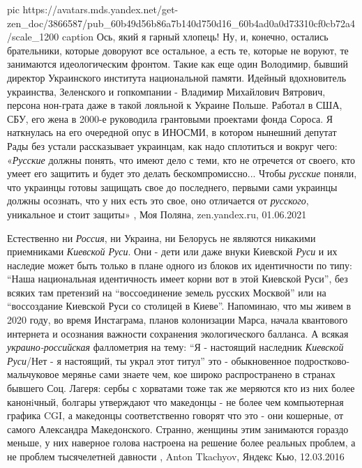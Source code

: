 \ifcmt
  pic https://avatars.mds.yandex.net/get-zen_doc/3866587/pub_60b49d56b86a7b140d750d16_60b4ad0a0d73310cf0cb72a4/scale_1200
  caption Ось, який я гарный хлопець!
\fi
Ну, и, конечно, остались брательники, которые доворуют все остальное, а есть
те, которые не воруют, те занимаются идеологическим фронтом. Такие как еще один
Володимир, бывший директор Украинского института национальной памяти. Идейный
вдохновитель украинства, Зеленского и гопкомпании - Владимир Михайлович
Вятрович, персона нон-грата даже в такой лояльной к Украине Польше. Работал в
США, СБУ, его жена в 2000-е руководила грантовыми проектами фонда Сороса. Я
наткнулась на его очередной опус в ИНОСМИ, в котором нынешний депутат Рады без
устали рассказывает украинцам, как надо сплотиться и вокруг чего: «\emph{Русские}
должны понять, что имеют дело с теми, кто не отречется от своего, кто умеет его
защитить и будет это делать бескомпромиссно... Чтобы \emph{русские} поняли, что украинцы
готовы защищать свое до последнего, первыми сами украинцы должны осознать, что
у них есть это свое, оно отличается от \emph{русского}, уникальное и стоит защиты»
, Моя Поляна, zen.yandex.ru, 01.06.2021

Естественно ни \emph{Россия}, ни Украина, ни Белорусь не являются никакими
приемниками \emph{Киевской Руси}. Они - дети или даже внуки Киевской
\emph{Руси} и их наследие может быть только в плане одного из блоков их
идентичности по типу: \enquote{Наша национальная идентичность имеет корни вот в
этой Киевской Руси}, без всяких там претензий на \enquote{воссоединение земель
русских Москвой} или на \enquote{воссоздание Киевской Руси со столицей в
Киеве}. Напоминаю, что мы живем в 2020 году, во время Инстаграма, планов
колонизации Марса, начала квантового интернета и осознания важности сохранения
экологического балланса. А всякая \emph{украино-российская} фаллометрия на
тему: \enquote{Я - настоящий наследник \emph{Киевской Руси}/Нет - я настоящий,
ты украл этот титул} это - обыкновенное подростково-мальчуковое мерянье сами
знаете чем, кое широко распространено в странах бывшего Соц. Лагеря: сербы с
хорватами тоже так же меряются кто из них более канонiчный, болгары утверждают
что македонцы - не более чем компьютерная графика CGI, а македонцы
соответственно говорят что это - они кошерные, от самого Александра
Македонского.  Странно, женщины этим занимаются гораздо меньше, у них наверное
голова настроена на решение более реальных проблем, а не проблем тысячелетней
давности
,
Anton Tkachyov, Яндекс Кью, 12.03.2016

